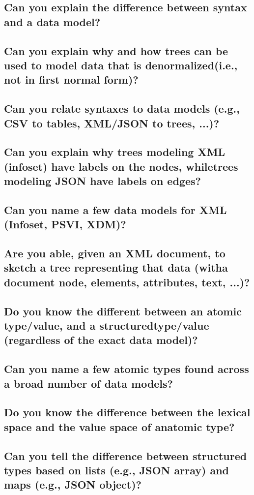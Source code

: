 \documentclass{article}
\begin{document}
\subsection{Can you explain the difference between syntax and a data model?}
\subsection{Can you explain why and how trees can be used to model data that is denormalized(i.e., not in first normal form)?}
\subsection{Can you relate syntaxes to data models (e.g., CSV to tables, XML/JSON to trees, ...)?}
\subsection{Can you explain why trees modeling XML (infoset) have labels on the nodes, whiletrees modeling JSON have labels on edges?}
\subsection{Can you name a few data models for XML (Infoset, PSVI, XDM)?}
\subsection{Are you able, given an XML document, to sketch a tree representing that data (witha document node, elements, attributes, text, ...)?}
\subsection{Do you know the different between an atomic type/value, and a structuredtype/value (regardless of the exact data model)?}
\subsection{Can you name a few atomic types found across a broad number of data models?}
\subsection{Do you know the difference between the lexical space and the value space of anatomic type?}
\subsection{Can you tell the difference between structured types based on lists (e.g., JSON array) and maps (e.g., JSON object)?}
\end{document}
